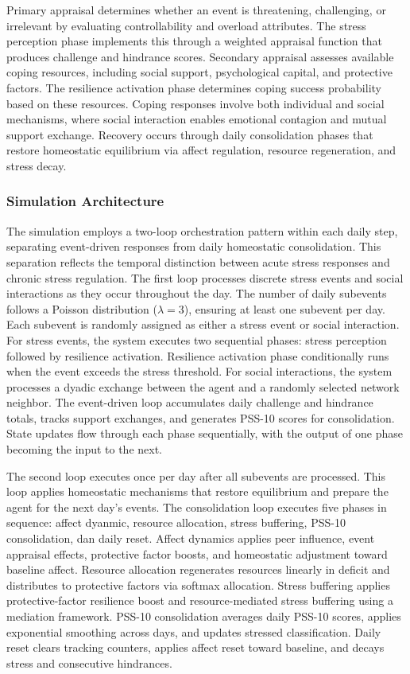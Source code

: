 \documentclass[
  letterpaper,
  DIV=11,
  numbers=noendperiod]{scrartcl}
\begin{document}
Primary appraisal determines whether an event is threatening,
challenging, or irrelevant by evaluating controllability and overload
attributes. The stress perception phase implements this through a
weighted appraisal function that produces challenge and hindrance
scores. Secondary appraisal assesses available coping resources,
including social support, psychological capital, and protective factors.
The resilience activation phase determines coping success probability
based on these resources. Coping responses involve both individual and
social mechanisms, where social interaction enables emotional contagion
and mutual support exchange. Recovery occurs through daily consolidation
phases that restore homeostatic equilibrium via affect regulation,
resource regeneration, and stress decay.

\subsubsection{Simulation Architecture}\label{simulation-architecture}

The simulation employs a two-loop orchestration pattern within each
daily step, separating event-driven responses from daily homeostatic
consolidation. This separation reflects the temporal distinction between
acute stress responses and chronic stress regulation. The first loop
processes discrete stress events and social interactions as they occur
throughout the day. The number of daily subevents follows a Poisson
distribution (\(\lambda = 3\)), ensuring at least one subevent per day.
Each subevent is randomly assigned as either a stress event or social
interaction. For stress events, the system executes two sequential
phases: stress perception followed by resilience activation. Resilience
activation phase conditionally runs when the event exceeds the stress
threshold. For social interactions, the system processes a dyadic
exchange between the agent and a randomly selected network neighbor. The
event-driven loop accumulates daily challenge and hindrance totals,
tracks support exchanges, and generates PSS-10 scores for consolidation.
State updates flow through each phase sequentially, with the output of
one phase becoming the input to the next.

The second loop executes once per day after all subevents are processed.
This loop applies homeostatic mechanisms that restore equilibrium and
prepare the agent for the next day's events. The consolidation loop
executes five phases in sequence: affect dyanmic, resource allocation,
stress buffering, PSS-10 consolidation, dan daily reset. Affect dynamics
applies peer influence, event appraisal effects, protective factor
boosts, and homeostatic adjustment toward baseline affect. Resource
allocation regenerates resources linearly in deficit and distributes to
protective factors via softmax allocation. Stress buffering applies
protective-factor resilience boost and resource-mediated stress
buffering using a mediation framework. PSS-10 consolidation averages
daily PSS-10 scores, applies exponential smoothing across days, and
updates stressed classification. Daily reset clears tracking counters,
applies affect reset toward baseline, and decays stress and consecutive
hindrances.
\end{document}
